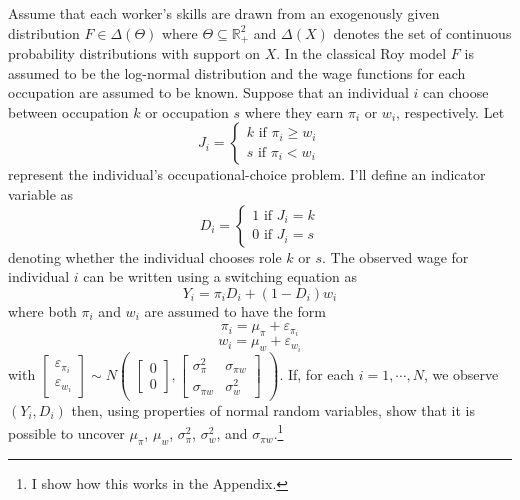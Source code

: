 \documentclass[12 pt]{article}
\begin{document}
Assume that each worker's skills are drawn from an exogenously given distribution $F\in \Delta(\Theta)$ where $\Theta \subseteq \mathbb{R}_+^2$ and $\Delta(X)$ denotes the set of continuous probability distributions with support on $X$. In the classical Roy model $F$ is assumed to be the log-normal distribution and the wage functions for each occupation are assumed to be known. Suppose that an individual $i$ can choose between occupation $k$ or occupation $s$ where they earn $\pi_i$ or $w_i$, respectively. Let 
\begin{equation}
	J_i =
	\begin{cases}
		k \text{ if } \pi_i \geq w_i\\
		s \text{ if } \pi_i < w_i
	\end{cases}
	\label{eqn:occ_choice}
\end{equation}
represent the individual's occupational-choice problem. I'll define an indicator variable as 
\begin{equation*}
	D_i =
	\begin{cases}
		1 \text{ if } J_i=k\\
		0 \text{ if } J_i=s
	\end{cases}
\end{equation*}
denoting whether the individual chooses role $k$ or $s$. The observed wage for individual $i$ can be written using a switching equation as
\begin{equation*}
	Y_i = \pi_i D_i + (1-D_i) w_i
\end{equation*}
where both $\pi_i$ and $w_i$ are assumed to have the form
\begin{equation}
	\pi_i = \mu_\pi + \varepsilon_{\pi_i}
	\label{eqn:pi_simple}
\end{equation}
\begin{equation}
	w_i = \mu_w + \varepsilon_{w_i}
	\label{eqn:w_simple}
\end{equation}
with $\begin{bmatrix}
	\varepsilon_{\pi_i}\\
	 \varepsilon_{w_i}
\end{bmatrix} \sim N \begin{pmatrix}
\begin{bmatrix}
0\\
0
\end{bmatrix},
\begin{bmatrix}
	\sigma_\pi^2 & \sigma_{\pi w}\\
	\sigma_{\pi w} & \sigma_w^2 
\end{bmatrix}
\end{pmatrix}$. If, for each $i=1,\cdots, N$, we observe $(Y_i,D_i)$ then, using properties of normal random variables, \citet{heckman1990empirical} show that it is possible to uncover $\mu_\pi$, $\mu_w$, $\sigma_\pi^2$, $\sigma_w^2$, and $\sigma_{\pi w}$.\footnote{I show how this works in the Appendix.}
\end{document}
